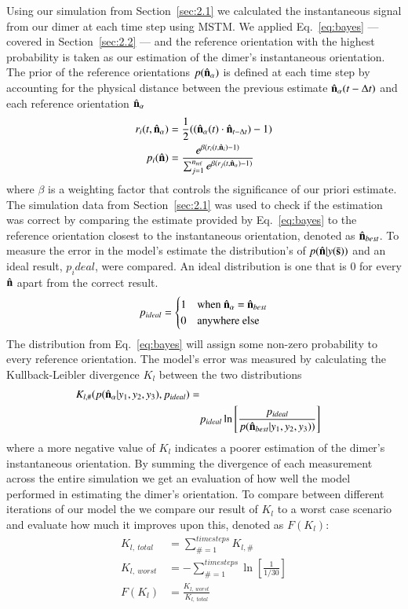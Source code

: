 \documentclass[final, 3p]{elsarticle}
\begin{document}
Using our simulation from Section~\ref{sec:2.1} we calculated the
instantaneous signal from our dimer at each time step using MSTM.  We
applied Eq.~\eqref{eq:bayes} --- covered in Section~\ref{sec:2.2} ---
and the reference orientation with the highest probability is taken as
our estimation of the dimer's instantaneous orientation.  The prior of
the reference orientations $p(\hat{\bf n}_\alpha)$ is defined at each
time step by accounting for the physical distance between the previous
estimate $\hat{\bf n}_{\alpha}(t - \Delta t)$ and each reference
orientation $\hat{\bf n}_\alpha$
\begin{align}
  r_i(t, \hat{\bf n}_\alpha)
  &= \frac{1}{2}((\hat{\bf n}_{\alpha}(t) \cdot \hat{\bf n}_{t-\Delta t})-1)
  \\
  p_i(\hat{\bf n})
  &= \frac{e^{\beta (r_i(t,\hat{\bf n}_i)-1)}}
{\sum_{j=1}^{n_{\rm ref}}e^{\beta(r_j(t, \hat{\bf n}_\alpha)-1)}}
\end{align}
where $\beta$ is a weighting factor that controls the significance of
our priori estimate.  The simulation data from Section~\ref{sec:2.1}
was used to check if the estimation was correct by comparing the
estimate provided by Eq.~\eqref{eq:bayes} to the reference orientation
closest to the instantaneous orientation, denoted as
$\hat{\bf n}_{best}$.  To measure the error in the model's estimate
the distribution's of $p(\hat{\bf n}| y(\bar{\bf s}))$ and an
ideal result, $p_ideal$, were compared.  An ideal distribution is one
that is 0 for every $\hat{\bf n}$ apart from the correct result.
\begin{align}
p_{ideal} = 
\begin{cases}
	1 & \text{when $\hat{\bf n}_\alpha$ = $\hat{\bf n}_{best}$}\\
	0 & \text{anywhere else}
\end{cases}
\end{align}
The distribution from Eq.~\eqref{eq:bayes} will assign some non-zero
probability to every reference orientation.  The model's error was
measured by calculating the Kullback-Leibler divergence $K_l$ between
the two distributions
\begin{align}
  K_{l, \#}(p(\hat{\bf n}_\alpha| y_1, y_2, y_3), p_{ideal})
  =\nonumber
  \\
&p_{ideal}\ln \left[\frac{p_{ideal}}{p(\hat{\bf n}_{best}| y_1,y_2,y_3))}
\right]
\end{align}
where a more negative value of $K_l$ indicates a poorer estimation of
the dimer's instantaneous orientation.  By summing the divergence of
each measurement across the entire simulation we get an evaluation of
how well the model performed in estimating the dimer's orientation.
To compare between different iterations of our model the we compare
our result of $K_l$ to a worst case scenario and evaluate how much it
improves upon this, denoted as $F(K_l)$:
\begin{align}
K_{l, \ total} &= \sum\limits_{\# =1}^{timesteps} K_{l,\#} \\
K_{l, \ worst} &= -\sum\limits_{\#=1}^{timesteps} \ln \left[\frac{1}{1/30} \right] \\
F(K_l) &= \frac{K_{l,\ worst}}{K_{l, \ total}}
\end{align}
\end{document}
